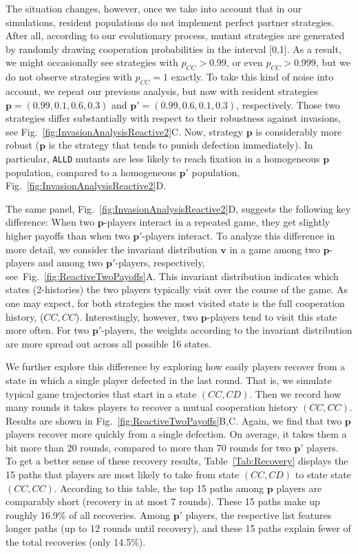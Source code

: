 \documentclass[9pt,twoside,lineno]{pnas-new}
\theoremstyle{plainCl1}
\theoremstyle{plainCl2}
\def\alld{\texttt{ALLD}}
\begin{document}
The situation changes, however, once we take into account that in our simulations, resident populations do not implement perfect partner strategies. 
After all, according to our evolutionary process, mutant strategies are generated by randomly drawing cooperation probabilities in the interval [0,1]. 
As a result, we might occasionally see strategies with $p_{CC}\!>\!0.99$, or even $p_{CC}\!>\!0.999$, but we do not observe strategies with $p_{CC}\!=\!1$ exactly. 
To take this kind of noise into account, we repeat our previous analysis, but now with resident strategies $\mathbf{p}\!=\!(0.99,0.1,0.6,0.3)$ and $\mathbf{p'}\!=\!(0.99,0.6,0.1,0.3)$, respectively. 
Those two strategies differ substantially with respect to their robustness against invasions, see Fig.~\ref{fig:InvasionAnalysisReactive2}C.
Now, strategy $\mathbf{p}$  is considerably more robust ($\mathbf{p}$ is the strategy that tends to punish defection immediately). 
In particular, \alld{} mutants are less likely to reach fixation in a homogeneous $\mathbf{p}$ population, compared to a homogeneous $\mathbf{p'}$ population, Fig.~\ref{fig:InvasionAnalysisReactive2}D.

The same panel, Fig.~\ref{fig:InvasionAnalysisReactive2}D, suggests the following key difference:
When two $\mathbf{p}$-players interact in a repeated game, they get slightly higher payoffs than when two $\mathbf{p'}$-players interact. 
To analyze this difference in more detail, we consider the invariant distribution $\mathbf{v}$ in a game among two $\mathbf{p}$-players and among two $\mathbf{p'}$-players, respectively, see~Fig.~\ref{fig:ReactiveTwoPayoffs}A. 
This invariant distribution indicates which states (2-histories) the two players typically visit over the course of the game. 
As one may expect, for both strategies the most visited state is the full cooperation history, ($CC,CC$). 
Interestingly, however, two $\mathbf{p}$-players tend to visit this state more often. 
For two $\mathbf{p'}$-players, the weights according to the invariant distribution are more spread out across all possible 16 states. 

We further explore this difference by exploring how easily players recover from a state in which a single player defected in the last round. 
That is, we simulate typical game trajectories that start in a state $(CC,CD)$. 
Then we record how many rounds it takes players to recover a mutual cooperation history $(CC,CC)$. 
Results are shown in Fig.~\ref{fig:ReactiveTwoPayoffs}B,C. 
Again, we find that two $\mathbf{p}$ players recover more quickly from a single defection. 
On average, it takes them a bit more than 20 rounds, compared to more than 70 rounds for two $\mathbf{p'}$ players. 
To get a better sense of these recovery results, Table~\ref{Tab:Recovery} displays the 15 paths that players are most likely to take from state $(CC,CD)$ to state state $(CC,CC)$. 
According to this table, the top 15 paths among $\mathbf{p}$ players are comparably short (recovery in at most 7 rounds). 
These 15 paths make up roughly 16.9\% of all recoveries. 
Among $\mathbf{p'}$ players, the respective list features longer paths (up to 12 rounds until recovery), and these 15 paths explain fewer of the total recoveries (only 14.5\%). 
\end{document}
